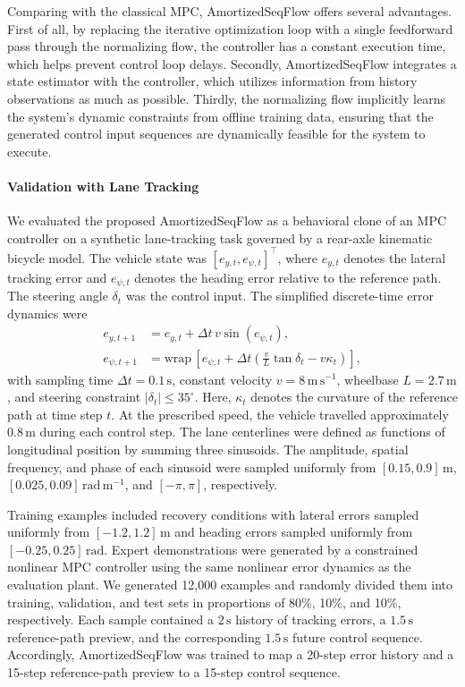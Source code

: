 Comparing with the classical \ac{MPC}, AmortizedSeqFlow offers several advantages. First of all, by replacing the iterative optimization loop with a single feedforward pass through the normalizing flow, the controller has a constant execution time, which helps prevent control loop delays. Secondly, AmortizedSeqFlow integrates a state estimator with the controller, which utilizes information from history observations as much as possible. Thirdly, the normalizing flow implicitly learns the system's dynamic constraints from offline training data, ensuring that the generated control input sequences are dynamically feasible for the system to execute.

\paragraph{Validation with Lane Tracking}
We evaluated the proposed AmortizedSeqFlow as a behavioral clone of an MPC controller on a synthetic lane-tracking task governed by a rear-axle kinematic bicycle model. The vehicle state was $[e_{y,t},e_{\psi,t}]^\top$, where $e_{y,t}$ denotes the lateral tracking error and $e_{\psi,t}$ denotes the heading error relative to the reference path. The steering angle $\delta_t$ was the control input. The simplified discrete-time error dynamics were
\begin{align}
e_{y,t+1} &= e_{y,t}+\Delta t\,v\sin(e_{\psi,t}),\\
e_{\psi,t+1} &= \text{wrap}\,[e_{\psi,t}+\Delta t(\frac{v}{L}\tan\delta_t-v\kappa_t)],
\end{align}
with sampling time $\Delta t=0.1\,\mathrm{s}$, constant velocity $v=8\,\mathrm{m}\,\mathrm{s}^{-1}$, wheelbase $L=2.7\,\mathrm{m}$, and steering constraint $|\delta_t|\leq35^\circ$. Here, $\kappa_t$ denotes the curvature of the reference path at time step $t$. At the prescribed speed, the vehicle travelled approximately $0.8\,\mathrm{m}$ during each control step. The lane centerlines were defined as functions of longitudinal position by summing three sinusoids. The amplitude, spatial frequency, and phase of each sinusoid were sampled uniformly from $[0.15,0.9]\,\mathrm{m}$, $[0.025,0.09]\,\mathrm{rad}\,\mathrm{m}^{-1}$, and $[-\pi,\pi]$, respectively.

Training examples included recovery conditions with lateral errors sampled uniformly from $[-1.2,1.2]\,\mathrm{m}$ and heading errors sampled uniformly from $[-0.25,0.25]\,\mathrm{rad}$. Expert demonstrations were generated by a constrained nonlinear MPC controller using the same nonlinear error dynamics as the evaluation plant. We generated 12,000 examples and randomly divided them into training, validation, and test sets in proportions of 80\%, 10\%, and 10\%, respectively. Each sample contained a $2\,\mathrm{s}$ history of tracking errors, a $1.5\,\mathrm{s}$ reference-path preview, and the corresponding $1.5\,\mathrm{s}$ future control sequence. Accordingly, AmortizedSeqFlow was trained to map a 20-step error history and a 15-step reference-path preview to a 15-step control sequence.

